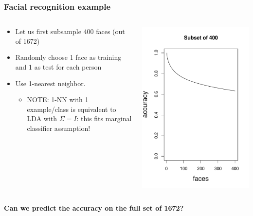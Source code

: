 \documentclass{beamer}
\begin{document}
\begin{frame}
\frametitle{Facial recognition example}
\begin{columns}
\begin{column}{0.5\textwidth}
\begin{itemize}
\item Let us first subsample 400 faces (out of 1672)
\item Randomly choose 1 face as training and 1 as test for each person
\item Use 1-nearest neighbor.
\begin{itemize}
\item NOTE: 1-NN with 1 example/class is equivalent to LDA with $\Sigma = I$: this fits marginal classifier assumption!
\end{itemize}
\end{itemize}
\pause
\end{column}
\begin{column}{0.5\textwidth}
\begin{center}
\includegraphics[scale = 0.4]{../facerec/acc_plot1.pdf}
\end{center}
\pause
\end{column}
\end{columns}
\vspace{0.1in}
\textbf{Can we predict the accuracy on the full set of 1672?}
\end{frame}
\end{document}
